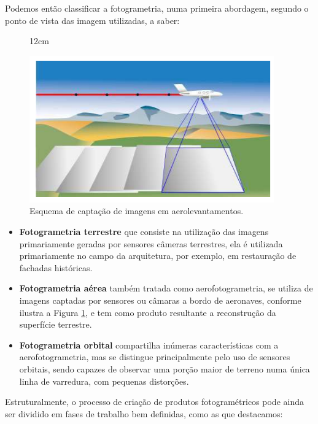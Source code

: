 Podemos então classificar a fotogrametria, numa primeira abordagem, segundo o ponto de vista das imagem utilizadas, a saber:

\begin{figure}[!ht]{12cm}
  \caption{Esquema de captação de imagens em aerolevantamentos.} \label{voo}
  \includegraphics[width=\hsize]{figuras/voo.png}
\end{figure}

\begin{itemize}
    \item \textbf{Fotogrametria terrestre} que consiste na utilização das imagens primariamente geradas por sensores câmeras terrestres, ela é utilizada primariamente no campo da arquitetura, por exemplo, em restauração de fachadas históricas.
    \item \textbf{Fotogrametria aérea} também tratada como aerofotogrametria, se utiliza de imagens captadas por sensores ou câmaras a bordo de aeronaves, conforme ilustra a Figura \ref{voo}, e tem como produto resultante a reconstrução da superfície terrestre.
    \item \textbf{Fotogrametria orbital} compartilha inúmeras características com a aerofotogrametria, mas se distingue principalmente pelo uso de sensores orbitais, sendo capazes de observar uma porção maior de terreno numa única linha de varredura, com pequenas distorções.
\end{itemize}

Estruturalmente, o processo de criação de produtos fotogramétricos pode ainda ser dividido em fases de trabalho bem definidas, como as que destacamos:

